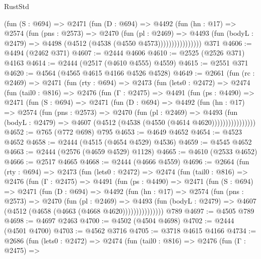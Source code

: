 \begin{lexlean}{RustStd}
\begin{coremodule}
                  (fun (S : @694) =>
                  @2471
                    (fun (D : @694) =>
                    @4492
                      (fun (hn : @17) =>
                      @2574
                        (fun (pns : @2573) =>
                        @2470
                          (fun (pl : @2469) =>
                          @4493
                            (fun (bodyL : @2479) => @4498 (@4512 (@4538 (@4550 @4573))))))))))))))))
    @371
@4606 := @4494 (@2462 @371)
@4607 := @2444 @4606
@4610 := @2525 (@2526 @371) @4163
@4614 := @2444 (@2517 (@4610 @4555) @4559)
@4615 := @2551 @371
@4620 := @4564 (@4565 @4615 @4166 @4526 @4528)
@4649 := @2661
    (fun (rc : @2469) =>
    @2471
      (fun (rty : @694) =>
      @2473
        (fun (lets0 : @2472) =>
        @2474
          (fun (tail0 : @816) =>
          @2476
            (fun (Γ : @2475) =>
            @4491
              (fun (ps : @4490) =>
              @2471
                (fun (S : @694) =>
                @2471
                  (fun (D : @694) =>
                  @4492
                    (fun (hn : @17) =>
                    @2574
                      (fun (pns : @2573) =>
                      @2470
                        (fun (pl : @2469) =>
                        @4493
                          (fun (bodyL : @2479) =>
                          @4607 (@4512 (@4538 (@4550 (@4614 @4620))))))))))))))))
@4652 := @765 (@772 @698) @795
@4653 := @4649 @4652
@4654 := @4523 @4652
@4658 := @2444 (@4515 (@4654 @4529) @4536)
@4659 := @4545 @4652
@4663 := @2444 (@2576 (@4659 @4529) @1128)
@4665 := @4610 (@2533 @4652)
@4666 := @2517 @4665
@4668 := @2444 (@4666 @4559)
@4696 := @2664
    (fun (rty : @694) =>
    @2473
      (fun (lets0 : @2472) =>
      @2474
        (fun (tail0 : @816) =>
        @2476
          (fun (Γ : @2475) =>
          @4491
            (fun (ps : @4490) =>
            @2471
              (fun (S : @694) =>
              @2471
                (fun (D : @694) =>
                @4492
                  (fun (hn : @17) =>
                  @2574
                    (fun (pns : @2573) =>
                    @2470
                      (fun (pl : @2469) =>
                      @4493
                        (fun (bodyL : @2479) =>
                        @4607 (@4512 (@4658 (@4663 (@4668 @4620)))))))))))))))
    @789
@4697 := @4505 @789
@4698 := @4697 @2463
@4700 := @4502 (@4504 @4698)
@4702 := @2444 (@4501 @4700)
@4703 := @4562 @3716
@4705 := @3718 @4615 @4166
@4734 := @2686
    (fun (lets0 : @2472) =>
    @2474
      (fun (tail0 : @816) =>
      @2476
        (fun (Γ : @2475) =>

\end{coremodule}
\end{lexlean}
